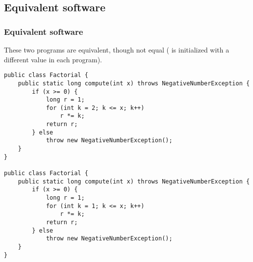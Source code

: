 \subsection*{Equivalent software}
\label{example:limitation-equivalence}


\begin{frame}[fragile]
\frametitle{Equivalent software}

These two programs are equivalent, though not equal ( is
initialized with a different value in each program).

\begin{lstlisting}
public class Factorial {
    public static long compute(int x) throws NegativeNumberException {
        if (x >= 0) {
            long r = 1;
            for (int k = 2; k <= x; k++) 
                r *= k;
            return r;
        } else 
            throw new NegativeNumberException();
    }
}

public class Factorial {
    public static long compute(int x) throws NegativeNumberException {
        if (x >= 0) {
            long r = 1;
            for (int k = 1; k <= x; k++) 
                r *= k;
            return r;
        } else 
            throw new NegativeNumberException();
    }
}
\end{lstlisting}

\end{frame}

